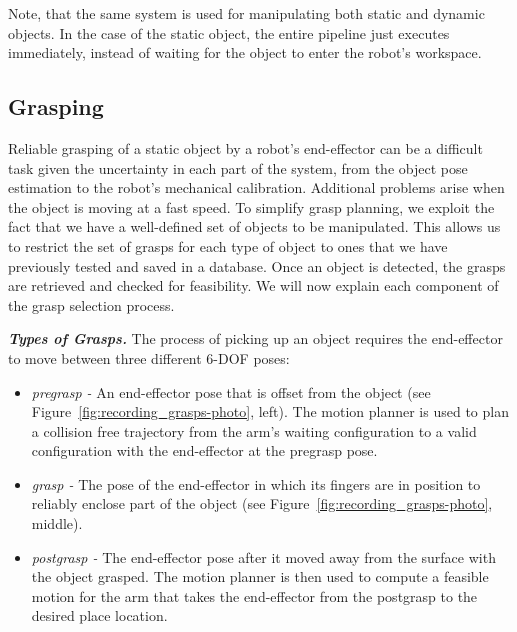 \documentclass[letterpaper, 10 pt, conference]{ieeeconf}  %
\begin{document}
Note, that the same system is used for manipulating both static and
dynamic objects. In the case of the static object, the entire pipeline
just executes immediately, instead of waiting for the object to enter
the robot's workspace.

\subsection{Grasping}

Reliable grasping of a static object by a robot's end-effector can be
a difficult task given the uncertainty in each part of the system,
from the object pose estimation to the robot's mechanical
calibration. Additional problems arise when the object is moving at a
fast speed. To simplify grasp planning, we exploit the fact that we
have a well-defined set of objects to be manipulated. This allows us
to restrict the set of grasps for each type of object to ones that we
have previously tested and saved in a database. Once an object is
detected, the grasps are retrieved and checked for feasibility. We
will now explain each component of the grasp selection process.

\textit{\textbf{Types of Grasps.}}
The process of picking up an object requires the end-effector to move between three different 6-DOF poses:
\begin{itemize}
\item \textit{pregrasp -} An end-effector pose that is offset from the object (see Figure~\ref{fig:recording_grasps-photo}, left). The motion planner is used to plan a collision free trajectory from the arm's waiting configuration to a valid configuration with the end-effector at the pregrasp pose.
\item \textit{grasp -} The pose of the end-effector in which its fingers are in position to reliably enclose part of the object (see Figure~\ref{fig:recording_grasps-photo}, middle).
\item \textit{postgrasp -} The end-effector pose after it moved away from the surface with the object grasped. The motion planner is then used to compute a feasible motion for the arm that takes the end-effector from the postgrasp to the desired place location.
\end{itemize}
\end{document}
